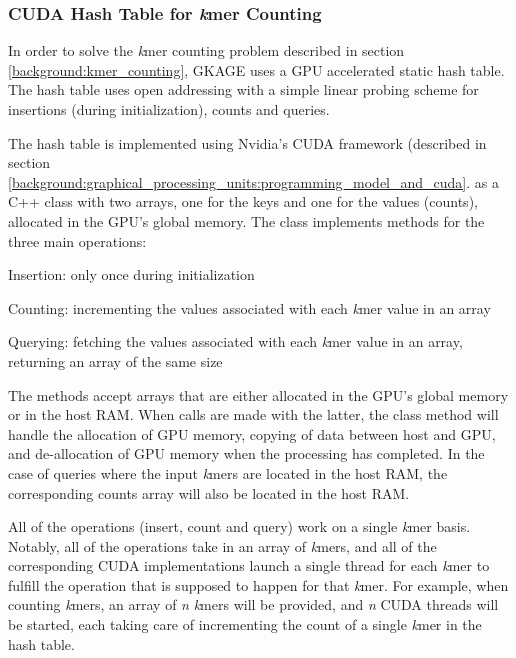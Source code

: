 \subsubsection{CUDA Hash Table for \textit{k}mer Counting}
In order to solve the \textit{k}mer counting problem described in section \ref{background:kmer_counting}, GKAGE uses a GPU accelerated static hash table.
The hash table uses open addressing with a simple linear probing scheme for insertions (during initialization), counts and queries.

The hash table is implemented using Nvidia's CUDA framework (described in section \ref{background:graphical_processing_units:programming_model_and_cuda}. 
as a C++ class with two arrays, one for the keys and one for the values (counts), allocated in the GPU's global memory.
The class implements methods for the three main operations:
\begin{compactenum}
  \item
    Insertion: only once during initialization
  \item
    Counting: incrementing the values associated with each \textit{k}mer value in an array
  \item
    Querying: fetching the values associated with each \textit{k}mer value in an array, returning an array of the same size
\end{compactenum}

The methods accept arrays that are either allocated in the GPU's global memory or in the host RAM.
When calls are made with the latter, the class method will handle the allocation of GPU memory, copying of data between host and GPU, and de-allocation of GPU memory when the processing has completed.
In the case of queries where the input \textit{k}mers are located in the host RAM, the corresponding counts array will also be located in the host RAM.

All of the operations (insert, count and query) work on a single \textit{k}mer basis. 
Notably, all of the operations take in an array of \textit{k}mers, and all of the corresponding CUDA implementations launch a single thread for each \textit{k}mer to fulfill the operation that is supposed to happen for that \textit{k}mer.
For example, when counting \textit{k}mers, an array of \textit{n} \textit{k}mers will be provided, and \textit{n} CUDA threads will be started, each taking care of incrementing the count of a single \textit{k}mer in the hash table.

